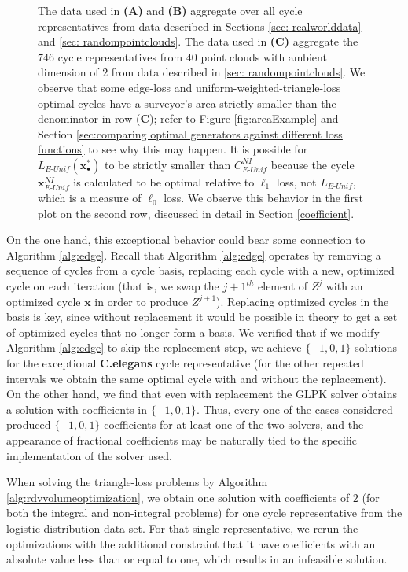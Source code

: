 \documentclass[11pt,onecolumn]{article}
\newcommand{\optimalrep}{\mathbf{x}}
\newcommand{\se}{Section }
\newcommand{\NI}{^{NI}}
\newcommand{\EU}{_{E\text{-}Unif}}
\newcommand{\obasis}{Z} %
\theoremstyle{plain}
\theoremstyle{definition}
\begin{document}
\begin{figure}[h!]
{The data used in \textbf{(A)} and \textbf{(B)} aggregate over all cycle representatives from data described in Sections \ref{sec: realworlddata} and \ref{sec: randompointclouds}. The data used in \textbf{(C)} aggregate the $746$ cycle representatives from $40$ point clouds with ambient dimension of $2$ from data described in \ref{sec: randompointclouds}. We observe that some edge-loss and uniform-weighted-triangle-loss optimal cycles have a surveyor's area strictly smaller than the denominator in row (\textbf{C}); refer to Figure \ref{fig:areaExample} and \se  \ref{sec:comparing optimal generators against different loss functions} to see why this may happen. It is possible for $L\EU(\optimalrep_\bullet^*)$ to be strictly smaller than $C\NI\EU$ because the cycle $\optimalrep\NI\EU$ is calculated to be optimal relative to $\ell_1$ loss, not $L\EU$, which is a measure of $\ell_0$ loss. We observe this behavior in the first plot on the second row, discussed in detail in \se \ref{coefficient}.} 

\label{fig:lengthcompare}
\end{figure}


 On the one hand, this exceptional behavior could bear some connection to Algorithm \ref{alg:edge}.  
 Recall that Algorithm \ref{alg:edge} operates by removing a sequence of cycles from a cycle basis, replacing each cycle with a new, optimized cycle on each iteration (that is, we swap the $j+1^{th}$ element of $\obasis^{j}$ with an optimized cycle $\optimalrep$ in order to produce $Z^{j+1}$). Replacing optimized cycles in the basis is key, since without replacement it would be possible in theory to get a set of optimized cycles that no longer form a basis. We verified that if we modify Algorithm \ref{alg:edge} to skip the replacement step, we achieve $\{-1,0,1\}$ solutions for the exceptional \textbf{C.elegans} cycle representative (for the other repeated intervals we obtain the same optimal cycle with and without the replacement).  
 On the other hand, we find that even with replacement the GLPK solver obtains a solution with coefficients in $\{-1, 0, 1\}$.  Thus, every one of the cases considered produced $\{-1, 0, 1\}$ coefficients for at least one of the two solvers, and the appearance of fractional coefficients may be naturally tied to the specific  implementation of the solver used.


 When solving the triangle-loss problems by Algorithm \ref{alg:rdvvolumeoptimization}, we obtain one solution with coefficients of $2$ (for both the integral and non-integral problems) for one cycle representative from the logistic distribution data set. For that single representative, we rerun the optimizations with the additional constraint that it have coefficients with an absolute value less than or equal to one, which results in an infeasible solution. 
\end{document}
